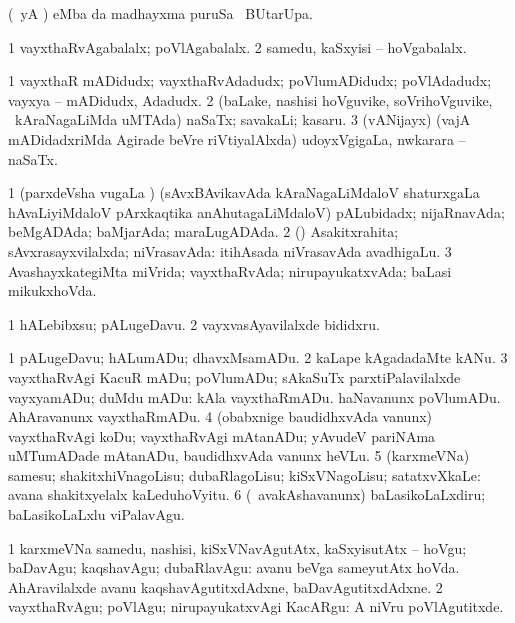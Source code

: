 \bentry
{} 
\gl{\kirx}
\expl{}
\bmng
(\pArxparx\ yA \pArxM)  eMba \kirx da madhayxma puruSa \Eva\ BUtarUpa. 
\emng
\eentry

\bentry
{} 
\gl{\gu}
\expl{}
\bmng
\bnum
\num{1} vayxthaRvAgabalalx; poVlAgabalalx. 
\num{2} samedu, kaSxyisi -- hoVgabalalx. 
\enum
\emng
\eentry

\bentry
{} 
\gl{\nA}
\expl{}
\bmng
\bnum
\num{1} vayxthaR mADidudx; vayxthaRvAdadudx; poVlumADidudx; poVlAdadudx; vayxya -- mADidudx, Adadudx. 
\num{2} (baLake, nashisi hoVguvike, soVrihoVguvike, \mo\ kAraNagaLiMda uMTAda) naSaTx; savakaLi; kasaru. 
\num{3} (vANijayx) (vajA mADidadxriMda Agirade beVre riVtiyalAlxda) udoyxVgigaLa, nwkarara -- naSaTx. 
\enum
\emng
\eentry

\bentry
{} 
\gl{\gu}
\expl{}
\bmng
\bnum
\num{1} (parxdeVsha \mo vugaLa \vi) (sAvxBAvikavAda kAraNagaLiMdaloV shaturxgaLa hAvaLiyiMdaloV pArxkaqtika anAhutagaLiMdaloV) pALubidadx; nijaRnavAda; beMgADAda; baMjarAda; maraLugADAda. 
\num{2} (\rUpa) Asakitxrahita; sAvxrasayxvilalxda; niVrasavAda:  itihAsada niVrasavAda avadhigaLu. 
\num{3} AvashayxkategiMta miVrida; vayxthaRvAda; nirupayukatxvAda; baLasi mikukxhoVda. 
\enum
\emng

\noindent
\gl{\pagu}
\expl{}
\bmng
\bnum
\num{1}  hALebibxsu; pALugeDavu. 
\num{2}  vayxvasAyavilalxde bididxru. 
\enum
\emng
\eentry

\bentry
{} 
\gl{\sakirx}
\expl{}
\bmng
\bnum
\num{1} pALugeDavu; hALumADu; dhavxMsamADu. 
\num{2} kaLape kAgadadaMte kANu. 
\num{3} vayxthaRvAgi KacuR mADu; poVlumADu; sAkaSuTx parxtiPalavilalxde vayxyamADu; duMdu mADu:  kAla vayxthaRmADu.  haNavanunx poVlumADu.  AhAravanunx vayxthaRmADu. 
\num{4} (obabxnige baudidhxvAda \mo vanunx) vayxthaRvAgi koDu; vayxthaRvAgi mAtanADu; yAvudeV pariNAma uMTumADade mAtanADu, baudidhxvAda \mo vanunx heVLu. 
\num{5} (karxmeVNa) samesu; shakitxhiVnagoLisu; dubaRlagoLisu; kiSxVNagoLisu; satatxvXkaLe:  avana shakitxyelalx kaLeduhoVyitu. 
\num{6} (\kanmu\ avakAshavanunx) baLasikoLaLxdiru; baLasikoLaLxlu viPalavAgu. 
\enum
\emng

\noindent 
\gl{\akirx}
\expl{}
\bmng
\bnum
\num{1} karxmeVNa samedu, nashisi, kiSxVNavAgutAtx, kaSxyisutAtx -- hoVgu; baDavAgu; kaqshavAgu; dubaRlavAgu:  avanu beVga sameyutAtx hoVda.  AhAravilalxde avanu kaqshavAgutitxdAdxne, baDavAgutitxdAdxne. 
\num{2} vayxthaRvAgu; poVlAgu; nirupayukatxvAgi KacARgu:  A niVru poVlAgutitxde. 
\enum
\emng

